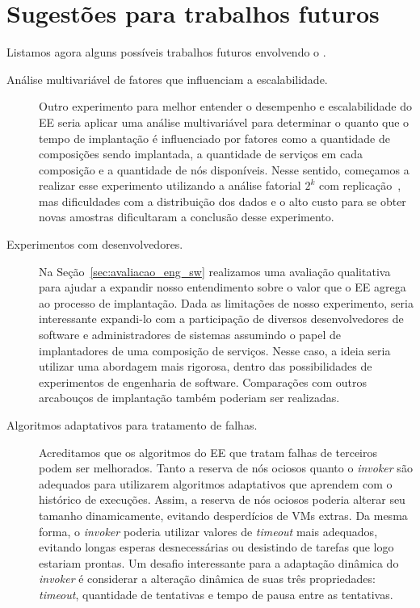 \section{Sugestões para trabalhos futuros}

Listamos agora alguns possíveis trabalhos futuros envolvendo o \ee.

\begin{description}

\item[Análise multivariável de fatores que influenciam a escalabilidade.] 
Outro experimento para melhor entender o desempenho e escalabilidade do EE
seria aplicar uma análise multivariável para determinar o quanto
que o tempo de implantação é influenciado por fatores como a quantidade de composições
sendo implantada, a quantidade de serviços em cada composição e a quantidade
de nós disponíveis.
Nesse sentido, começamos a realizar esse experimento utilizando a análise fatorial $2^k$
com replicação~\cite{Jain20002kr}, mas dificuldades com a distribuição dos dados e o alto custo
para se obter novas amostras dificultaram a conclusão desse experimento.

\item[Experimentos com desenvolvedores.] 
Na Seção~\ref{sec:avaliacao_eng_sw} realizamos uma avaliação qualitativa para
ajudar a expandir nosso entendimento sobre o valor que o EE agrega ao processo de implantação.
Dada as limitações de nosso experimento, seria interessante expandi-lo
com a participação de diversos desenvolvedores de software
e administradores de sistemas assumindo o papel de implantadores de uma composição de serviços.
Nesse caso, a ideia seria utilizar uma abordagem mais rigorosa,
dentro das possibilidades de experimentos de engenharia de software.
Comparações com outros arcabouços de implantação também poderiam ser realizadas.

\item[Algoritmos adaptativos para tratamento de falhas.] 
Acreditamos que os algoritmos do EE que tratam falhas de terceiros podem ser melhorados.
Tanto a reserva de nós ociosos quanto o \emph{invoker} são adequados 
para utilizarem algoritmos adaptativos que aprendem com o histórico de
execuções. Assim, a reserva de nós ociosos poderia alterar seu tamanho dinamicamente,
evitando desperdícios de VMs extras. Da mesma forma, o \emph{invoker}
poderia utilizar valores de \emph{timeout} mais adequados, evitando longas
esperas desnecessárias ou desistindo de tarefas que logo estariam prontas.
Um desafio interessante para a adaptação dinâmica do \emph{invoker} é
considerar a alteração dinâmica de suas três propriedades:
\emph{timeout}, quantidade de tentativas e tempo de pausa entre as tentativas.


\end{description}
